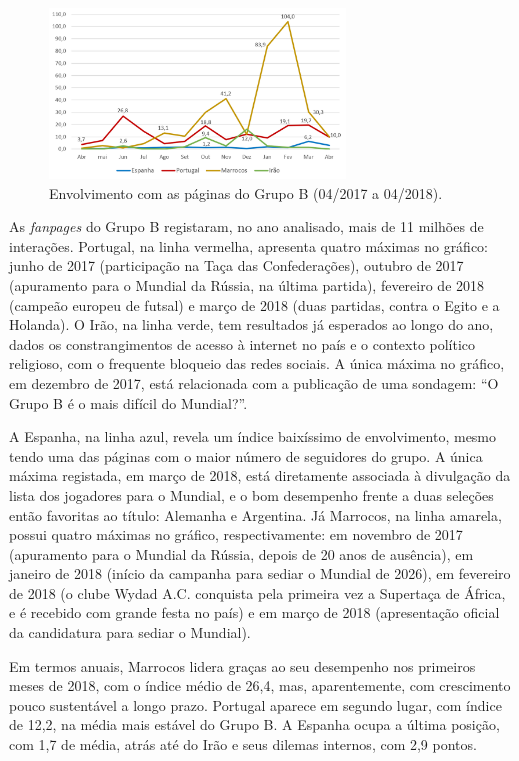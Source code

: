 \documentclass{textolivre}
\begin{document}
\begin{figure}[htbp]
 \centering
 \includegraphics[width=0.7\textwidth]{figure04.png}
 \caption{Envolvimento com as páginas do Grupo B (04/2017 a 04/2018).}
 \label{fig4}
\end{figure}

As \emph{fanpages} do Grupo B registaram, no ano analisado, mais de 11 milhões de interações. Portugal, na linha vermelha, apresenta quatro máximas no gráfico: junho de 2017 (participação na Taça das Confederações), outubro de 2017 (apuramento para o Mundial da Rússia, na última partida), fevereiro de 2018 (campeão europeu de futsal) e março de 2018 (duas partidas, contra o Egito e a Holanda). O Irão, na linha verde, tem resultados já esperados ao longo do ano, dados os constrangimentos de acesso à internet no país e o contexto político religioso, com o frequente bloqueio das redes sociais. A única máxima no gráfico, em dezembro de 2017, está relacionada com a publicação de uma sondagem: “O Grupo B é o mais difícil do Mundial?”.

A Espanha, na linha azul, revela um índice baixíssimo de envolvimento, mesmo tendo uma das páginas com o maior número de seguidores do grupo. A única máxima registada, em março de 2018, está diretamente associada à divulgação da lista dos jogadores para o Mundial, e o bom desempenho frente a duas seleções então favoritas ao título: Alemanha e Argentina. Já Marrocos, na linha amarela, possui quatro máximas no gráfico, respectivamente: em novembro de 2017 (apuramento para o Mundial da Rússia, depois de 20 anos de ausência), em janeiro de 2018 (início da campanha para sediar o Mundial de 2026), em fevereiro de 2018 (o clube Wydad A.C. conquista pela primeira vez a Supertaça de África, e é recebido com grande festa no país) e em março de 2018 (apresentação oficial da candidatura para sediar o Mundial).

Em termos anuais, Marrocos lidera graças ao seu desempenho nos primeiros meses de 2018, com o índice médio de 26,4, mas, aparentemente, com crescimento pouco sustentável a longo prazo. Portugal aparece em segundo lugar, com índice de 12,2, na média mais estável do Grupo B. A Espanha ocupa a última posição, com 1,7 de média, atrás até do Irão e seus dilemas internos, com 2,9 pontos.
\end{document}
